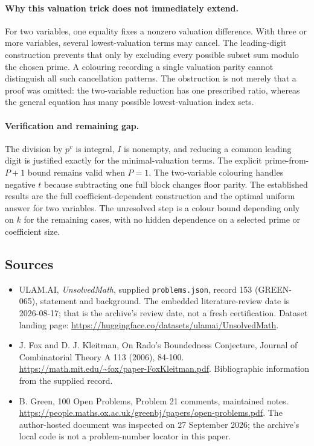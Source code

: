 \documentclass[11pt,a4paper]{article}
\begin{document}
\paragraph{Why this valuation trick does not immediately extend.}
For two variables, one equality fixes a nonzero valuation difference. With three or more variables, several lowest-valuation terms may cancel. The leading-digit construction prevents that only by excluding every possible subset sum modulo the chosen prime. A colouring recording a single valuation parity cannot distinguish all such cancellation patterns. The obstruction is not merely that a proof was omitted: the two-variable reduction has one prescribed ratio, whereas the general equation has many possible lowest-valuation index sets.

\paragraph{Verification and remaining gap.}
The division by $p^v$ is integral, $I$ is nonempty, and reducing a common leading digit is justified exactly for the minimal-valuation terms. The explicit prime-from-$P+1$ bound remains valid when $P=1$. The two-variable colouring handles negative $t$ because subtracting one full block changes floor parity. The established results are the full coefficient-dependent construction and the optimal uniform answer for two variables. The unresolved step is a colour bound depending only on $k$ for the remaining cases, with no hidden dependence on a selected prime or coefficient size.

\subsection{Sources}

{\small

\begin{itemize}

\item[\hypertarget{source:153:1}{S1}] ULAM.AI, \emph{UnsolvedMath}, supplied \texttt{problems.json}, record 153 (GREEN-065), statement and background. The embedded literature-review date is 2026-08-17; that is the archive’s review date, not a fresh certification. Dataset landing page: \url{https://huggingface.co/datasets/ulamai/UnsolvedMath}.

\item[\hypertarget{source:153:2}{S2}] J. Fox and D. J. Kleitman, On Rado's Boundedness Conjecture, Journal of Combinatorial Theory A 113 (2006), 84-100. \url{https://math.mit.edu/~fox/paper-FoxKleitman.pdf}. Bibliographic information from the supplied record.

\item[\hypertarget{source:153:3}{S3}] B. Green, 100 Open Problems, Problem 21 comments, maintained notes. \url{https://people.maths.ox.ac.uk/greenbj/papers/open-problems.pdf}. The author-hosted document was inspected on 27 September 2026; the archive’s local code is not a problem-number locator in this paper.

\end{itemize}

}

\label{end:153}
\end{document}
